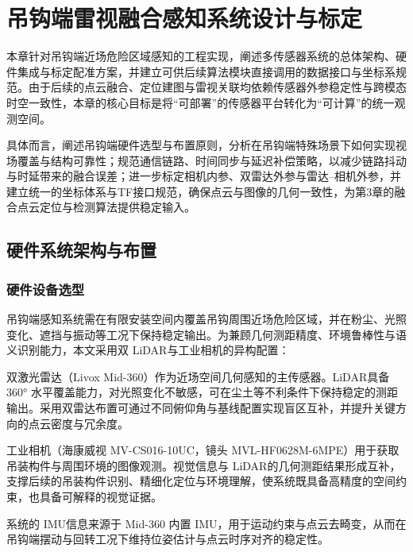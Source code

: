﻿\chapter{吊钩端雷视融合感知系统设计与标定}\label{ux540aux94a9ux7aefux611fux77e5ux7cfbux7edfux6784ux5efaux4e0eux6807ux5b9a}

本章针对吊钩端近场危险区域感知的工程实现，阐述多传感器系统的总体架构、硬件集成与标定配准方案，并建立可供后续算法模块直接调用的数据接口与坐标系规范。由于后续的点云融合、定位建图与雷视关联均依赖传感器外参稳定性与跨模态时空一致性，本章的核心目标是将“可部署”的传感器平台转化为“可计算”的统一观测空间。

具体而言，阐述吊钩端硬件选型与布置原则，分析在吊钩端特殊场景下如何实现视场覆盖与结构可靠性；规范通信链路、时间同步与延迟补偿策略，以减少链路抖动与时延带来的融合误差；进一步标定相机内参、双雷达外参与雷达--相机外参，并建立统一的坐标体系与TF接口规范，确保点云与图像的几何一致性，为第3章的融合点云定位与检测算法提供稳定输入。

\section{硬件系统架构与布置}\label{ux7cfbux7edfux603bux4f53ux67b6ux6784ux4e0eux786cux4ef6ux9009ux578bux5e03ux7f6e}

\subsection{硬件设备选型}\label{sec:hardware_selection}

吊钩端感知系统需在有限安装空间内覆盖吊钩周围近场危险区域，并在粉尘、光照变化、遮挡与振动等工况下保持稳定输出。为兼顾几何测距精度、环境鲁棒性与语义识别能力，本文采用双 LiDAR与工业相机的异构配置：

双激光雷达（Livox Mid-360）作为近场空间几何感知的主传感器。LiDAR具备 360° 水平覆盖能力，对光照变化不敏感，可在尘土等不利条件下保持稳定的测距输出。采用双雷达布置可通过不同俯仰角与基线配置实现盲区互补，并提升关键方向的点云密度与冗余度。

工业相机（海康威视 MV-CS016-10UC，镜头 MVL-HF0628M-6MPE）用于获取吊装构件与周围环境的图像观测。视觉信息与 LiDAR的几何测距结果形成互补，支撑后续的吊装构件识别、精细化定位与环境理解，使系统既具备高精度的空间约束，也具备可解释的视觉证据。

系统的 IMU信息来源于 Mid-360 内置 IMU，用于运动约束与点云去畸变，从而在吊钩端摆动与回转工况下维持位姿估计与点云时序对齐的稳定性。

